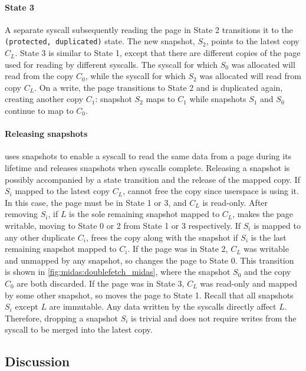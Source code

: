 \paragraph{State 3}
A separate syscall subsequently reading the page in State 2 transitions
it to the \texttt{(protected, duplicated)} state.
The new snapshot, $S_2$, points to the latest copy $C_L$.
State 3 is similar to State 1, except that there are different copies of
the page used for reading by different syscalls.
The syscall for which $S_0$ was allocated will read from the copy $C_0$,
while the syscall for which $S_2$ was allocated will read from copy $C_L$.
On a write, the page transitions to State 2 and is duplicated again,
creating another copy $C_1$: snapshot $S_2$ maps to $C_1$ while
snapshots $S_1$ and $S_0$ continue to map to $C_0$.

\paragraph{Releasing snapshots}
\midas uses snapshots to enable a syscall to read the same data from a page
during its lifetime and releases snapshots when syscalls complete.
Releasing a snapshot is possibly accompanied by a state transition
and the release of the mapped copy.
If $S_i$ mapped to the latest copy $C_L$, \midas cannot free the copy
since userspace is using it.
In this case, the page must be in State 1 or 3, and $C_L$ is read-only.
After removing $S_i$, if $L$ is the sole remaining snapshot mapped to $C_L$,
\midas makes the page writable, moving to State 0 or 2 from State
1 or 3 respectively.
If $S_i$ is mapped to any other duplicate $C_i$, \midas frees the copy along
with the snapshot if $S_i$ is the last remaining snapshot mapped to $C_i$.
If the page was in State 2, $C_L$ was writable and unmapped by any snapshot,
so \midas changes the page to State 0.
This transition is shown in \autoref{fig:midas:doublefetch_midas}, where the
snapshot $S_0$ and the copy $C_0$ are both discarded.
If the page was in State 3, $C_L$ was read-only and mapped by some other
snapshot, so \midas moves the page to State 1.
Recall that all snapshots $S_i$ except $L$ are immutable.
Any data written by the syscalls directly affect $L$.
Therefore, dropping a snapshot $S_i$ is trivial and does not require
writes from the syscall to be merged into the latest copy.

\subsection{Discussion}
\label{sec:midas:midas:design:discussion}

